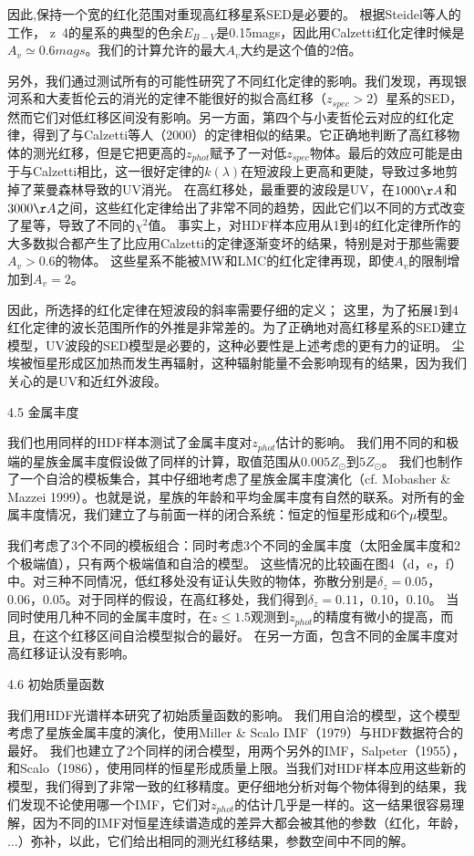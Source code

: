 \documentclass[8pt,a4paper,openany,twoside]{book}
\begin{document}
因此,保持一个宽的红化范围对重现高红移星系SED是必要的。
根据Steidel等人的工作，
z~4的星系的典型的色余$E_{B-V}$是0.15mags，因此用Calzetti红化定律时候是$A_v\simeq0.6 mags$。我们的计算允许的最大$A_v$大约是这个值的2倍。
 
另外，我们通过测试所有的可能性研究了不同红化定律的影响。我们发现，再现银河系和大麦哲伦云的消光的定律不能很好的拟合高红移（$z_{spec}>2$）星系的SED，然而它们对低红移区间没有影响。另一方面，第四个与小麦哲伦云对应的红化定律，得到了与Calzetti等人（2000）的定律相似的结果。它正确地判断了高红移物体的测光红移，但是它把更高的$z_{phot}$赋予了一对低$z_{spec}$物体。最后的效应可能是由于与Calzetti相比，这一很好定律的$k(\lambda)$在短波段上更高和更陡，导致过多地剪掉了莱曼森林导致的UV消光。
在高红移处，最重要的波段是UV，在$1000\AA$和$3000\AA$之间，这些红化定律给出了非常不同的趋势，因此它们以不同的方式改变了星等，导致了不同的$\chi^2$值。
事实上，对HDF样本应用从1到4的红化定律所作的大多数拟合都产生了比应用Calzetti的定律逐渐变坏的结果，特别是对于那些需要$A_v>0.6$的物体。
这些星系不能被MW和LMC的红化定律再现，即使$A_v$的限制增加到$A_v=2$。
 
因此，所选择的红化定律在短波段的斜率需要仔细的定义；
这里，为了拓展1到4红化定律的波长范围所作的外推是非常差的。为了正确地对高红移星系的SED建立模型，UV波段的SED模型是必要的，这种必要性是上述考虑的更有力的证明。
尘埃被恒星形成区加热而发生再辐射，这种辐射能量不会影响现有的结果，因为我们关心的是UV和近红外波段。
 
4.5 金属丰度
 
我们也用同样的HDF样本测试了金属丰度对$z_{phot}$估计的影响。
我们用不同的和极端的星族金属丰度假设做了同样的计算，取值范围从$0.005Z_\odot$到$5Z_\odot$。
我们也制作了一个自洽的模板集合，其中仔细地考虑了星族金属丰度演化（cf. Mobasher \& Mazzei 1999）。也就是说，星族的年龄和平均金属丰度有自然的联系。对所有的金属丰度情况，我们建立了与前面一样的闭合系统：恒定的恒星形成和6个$\mu$模型。
 
我们考虑了3个不同的模板组合：同时考虑3个不同的金属丰度（太阳金属丰度和2个极端值），只有两个极端值和自洽的模型。
这些情况的比较画在图4（d，e，f）中。对三种不同情况，低红移处没有证认失败的物体，弥散分别是$\delta_z=0.05$，0.06，0.05。对于同样的假设，在高红移处，我们得到$\delta_z=0.11$，0.10，0.10。
当同时使用几种不同的金属丰度时，在$z\leq1.5$观测到$z_{phot}$的精度有微小的提高，而且，在这个红移区间自洽模型拟合的最好。
在另一方面，包含不同的金属丰度对高红移证认没有影响。
 
4.6 初始质量函数
 
我们用HDF光谱样本研究了初始质量函数的影响。
我们用自洽的模型，这个模型考虑了星族金属丰度的演化，使用Miller \& Scalo IMF（1979）与HDF数据符合的最好。
我们也建立了2个同样的闭合模型，用两个另外的IMF，Salpeter（1955），和Scalo（1986），使用同样的恒星形成质量上限。当我们对HDF样本应用这些新的模型，我们得到了非常一致的红移精度。更仔细地分析对每个物体得到的结果，我们发现不论使用哪一个IMF，它们对$z_{phot}$的估计几乎是一样的。这一结果很容易理解，因为不同的IMF对恒星连续谱造成的差异大都会被其他的参数（红化，年龄，$\dots$）弥补，以此，它们给出相同的测光红移结果，参数空间中不同的解。
 
\end{document}
